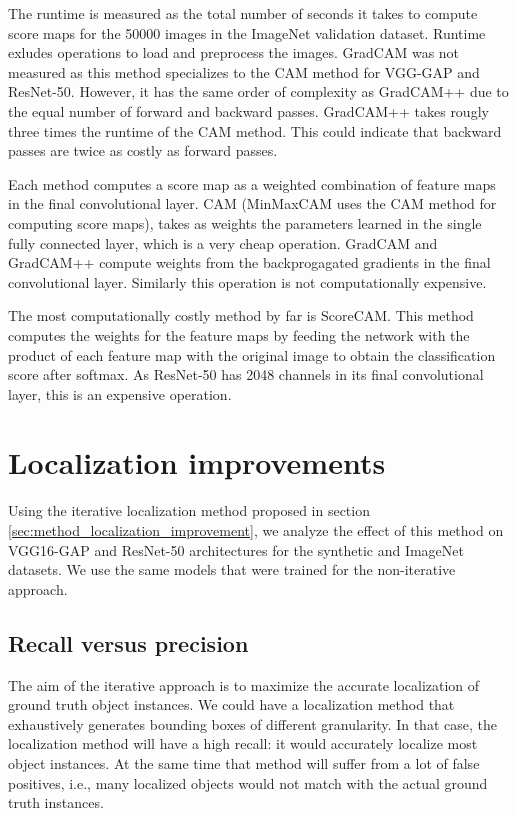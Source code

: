The runtime is measured as the total number of seconds it takes to compute score maps for the 50000 images in the ImageNet validation dataset. Runtime exludes operations to load and preprocess the images. GradCAM was not measured as this method specializes to the CAM method for VGG-GAP and ResNet-50. However, it has the same order of complexity as GradCAM++ due to the equal number of forward and backward passes. GradCAM++ takes rougly three times the runtime of the CAM method. This could indicate that backward passes are twice as costly as forward passes.

Each method computes a score map as a weighted combination of feature maps in the final convolutional layer. CAM (MinMaxCAM uses the CAM method for computing score maps), takes as weights the parameters learned in the single fully connected layer, which is a very cheap operation. GradCAM and GradCAM++ compute weights from the backprogagated gradients in the final convolutional layer. Similarly this operation is not computationally expensive.

The most computationally costly method by far is ScoreCAM. This method computes the weights for the feature maps by feeding the network with the product of each feature map with the original image to obtain the classification score after softmax. As ResNet-50 has 2048 channels in its final convolutional layer, this is an expensive operation.

\section{Localization improvements}

Using the iterative localization method proposed in section \ref{sec:method_localization_improvement}, we analyze the effect of this method on VGG16-GAP and ResNet-50 architectures for the synthetic and ImageNet datasets. We use the same models that were trained for the non-iterative approach.

\subsection{Recall versus precision}
The aim of the iterative approach is to maximize the accurate localization of ground truth object instances. We could have a localization method that exhaustively generates bounding boxes of different granularity. In that case, the localization method will have a high recall: it would accurately localize most object instances. At the same time that method will suffer from a lot of false positives, i.e., many localized objects would not match with the actual ground truth instances. 

